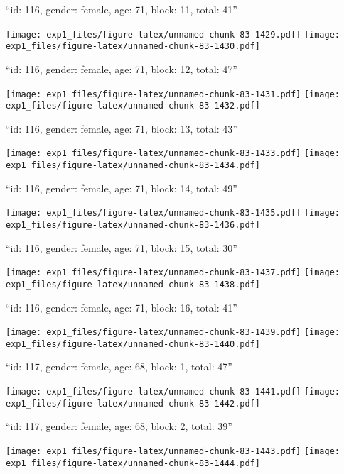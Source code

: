 \documentclass[11pt,,]{article}
\begin{document}
\newpage
[1] 

``id: 116, gender: female, age: 71, block: 11, total: 41''

\texttt{[image: exp1\_files/figure-latex/unnamed-chunk-83-1429.pdf]}
\texttt{[image: exp1\_files/figure-latex/unnamed-chunk-83-1430.pdf]}

\newpage
[1] 

``id: 116, gender: female, age: 71, block: 12, total: 47''

\texttt{[image: exp1\_files/figure-latex/unnamed-chunk-83-1431.pdf]}
\texttt{[image: exp1\_files/figure-latex/unnamed-chunk-83-1432.pdf]}

\newpage
[1] 

``id: 116, gender: female, age: 71, block: 13, total: 43''

\texttt{[image: exp1\_files/figure-latex/unnamed-chunk-83-1433.pdf]}
\texttt{[image: exp1\_files/figure-latex/unnamed-chunk-83-1434.pdf]}

\newpage
[1] 

``id: 116, gender: female, age: 71, block: 14, total: 49''

\texttt{[image: exp1\_files/figure-latex/unnamed-chunk-83-1435.pdf]}
\texttt{[image: exp1\_files/figure-latex/unnamed-chunk-83-1436.pdf]}

\newpage
[1] 

``id: 116, gender: female, age: 71, block: 15, total: 30''

\texttt{[image: exp1\_files/figure-latex/unnamed-chunk-83-1437.pdf]}
\texttt{[image: exp1\_files/figure-latex/unnamed-chunk-83-1438.pdf]}

\newpage
[1] 

``id: 116, gender: female, age: 71, block: 16, total: 41''

\texttt{[image: exp1\_files/figure-latex/unnamed-chunk-83-1439.pdf]}
\texttt{[image: exp1\_files/figure-latex/unnamed-chunk-83-1440.pdf]}

\newpage
[1] 

``id: 117, gender: female, age: 68, block: 1, total: 47''

\texttt{[image: exp1\_files/figure-latex/unnamed-chunk-83-1441.pdf]}
\texttt{[image: exp1\_files/figure-latex/unnamed-chunk-83-1442.pdf]}

\newpage
[1] 

``id: 117, gender: female, age: 68, block: 2, total: 39''

\texttt{[image: exp1\_files/figure-latex/unnamed-chunk-83-1443.pdf]}
\texttt{[image: exp1\_files/figure-latex/unnamed-chunk-83-1444.pdf]}
\end{document}

